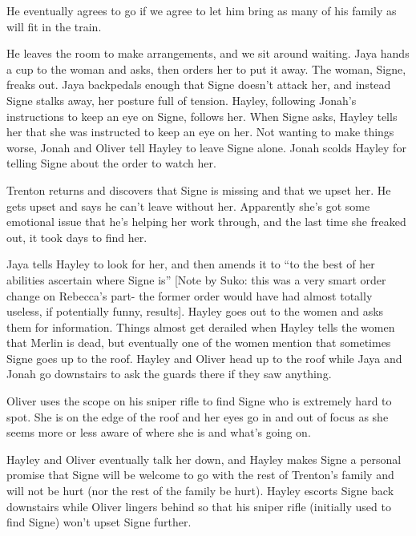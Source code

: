 He eventually agrees to go if we agree to let him bring as many of his family as will fit in the train.



He leaves the room to make arrangements, and we sit around waiting.  Jaya hands a cup to the woman and asks, then orders her to put it away.  The woman, Signe, freaks out.  Jaya backpedals enough that Signe doesn't attack her, and instead Signe stalks away, her posture full of tension.  Hayley, following Jonah's instructions to keep an eye on Signe, follows her.  When Signe asks, Hayley tells her that she was instructed to keep an eye on her.  Not wanting to make things worse, Jonah and Oliver tell Hayley to leave Signe alone.  Jonah scolds Hayley for telling Signe about the order to watch her. 



Trenton returns and discovers that Signe is missing and that we upset her. He gets upset and says he can't leave without her.  Apparently she's got some emotional issue that he's helping her work through, and the last time she freaked out, it took days to find her.



Jaya tells Hayley to look for her, and then amends it to ``to the best of her abilities ascertain where Signe is'' {[}Note by Suko: this was a very smart order change on Rebecca's part- the former order would have had almost totally useless, if potentially funny, results{]}.  Hayley goes out to the women and asks them for information.  Things almost get derailed when Hayley tells the women that Merlin is dead, but eventually one of the women mention that sometimes Signe goes up to the roof.  Hayley and Oliver head up to the roof while Jaya and Jonah go downstairs to ask the guards there if they saw anything.



Oliver uses the scope on his sniper rifle to find Signe who is extremely hard to spot.  She is on the edge of the roof and her eyes go in and out of focus as she seems more or less aware of where she is and what's going on.



Hayley and Oliver eventually talk her down, and Hayley makes Signe a personal promise that Signe will be welcome to go with the rest of Trenton's family and will not be hurt (nor the rest of the family be hurt).  Hayley escorts Signe back downstairs while Oliver lingers behind so that his sniper rifle (initially used to find Signe) won't upset Signe further.



